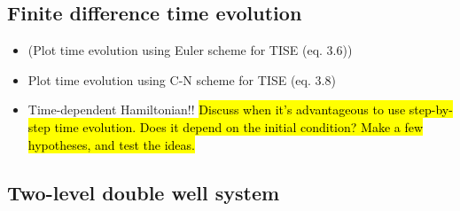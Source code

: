 \subsection*{Finite difference time evolution}
\begin{itemize}
    \item (Plot time evolution using Euler scheme for TISE (eq. 3.6))
    \item Plot time evolution using C-N scheme for TISE (eq. 3.8)
    \item Time-dependent Hamiltonian!! \hl{Discuss when it's advantageous to use step-by-step time evolution. Does it depend on the initial condition? Make a few hypotheses, and test the ideas.}
\end{itemize}

\subsection*{Two-level double well system}

